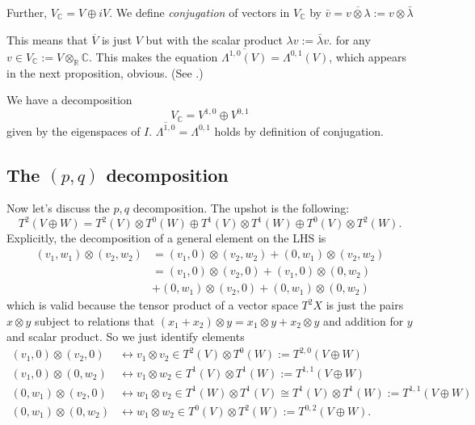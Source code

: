 Further, $V_\mathbb{C}=V \oplus i V$.
We define {\it conjugation} of vectors in
$V_{\mathbb{C}}$ by
$\bar{v}=\overline{v \otimes \lambda} := v
\otimes \bar{\lambda}$

This means that $\overline{V}$ is just $V$
but
with the scalar product $\lambda
v:=\bar{\lambda}v$.
for any $v \in V_{\mathbb{C}}:=V
\otimes_{\mathbb{R}}\mathbb{C}$.
This makes the equation
$\overline{\Lambda^{1,0}(V)}=\Lambda^{0,1}(V)
$,
which appears in the next proposition,
obvious.
(See \cite[p. 25]{huc}.)

\begin{lemma}
\label{lemma-i-eigenspace-decomposition}
We have a decomposition
$$
V_\mathbb{C}=V^{1,0}\oplus V^{0,1}
$$
given by the eigenspaces of $I$.
$\overline{\Lambda^{1,0}}=\Lambda^{0,1}$
holds by definition of conjugation.
\end{lemma}


\subsection{The $(p,q)$ decomposition}
\label{subsection-pq-decomposition}

Now let's discuss the $p,q$ decomposition.
The upshot is the following:
$$
T^2(V \oplus  W)=
T^2(V)\otimes T^0(W)
\oplus T^1(V)\otimes T^1(W)
\oplus T^0(V)\otimes T^2(W).
$$
Explicitly, the decomposition of a general
element on the LHS is
$$
\begin{aligned}
(v_1,w_1)\otimes(v_2,w_2)
&=(v_1,0)\otimes(v_2,w_2)+(0,w_1)\otimes(v_2,
w_2)\\
&=(v_1,0)\otimes(v_2,0)+(v_1,0)\otimes(0,w_2)
\\
&+(0,w_1)\otimes(v_2,0)+(0,w_1)\otimes(0,w_2)
\end{aligned}
$$
which is valid because the tensor product of
a vector space
$T^2X$ is just the pairs $x \otimes y$
subject
to relations that $(x_1+x_2)\otimes y=x_1
\otimes y+x_2\otimes y$
and addition for $y$ and scalar product.
So we just identify elements
$$
\begin{aligned}
(v_1,0)\otimes(v_2,0)
&\leftrightarrow
v_1 \otimes v_2 \in T^2(V) \otimes
T^0(W):=T^{2,0}(V \oplus W)\\
(v_1,0)\otimes(0,w_2)
&\leftrightarrow
v_1 \otimes w_2 \in T^1(V) \otimes T^1(W):=
T^{1,1}(V\oplus W)\\
(0,w_1)\otimes(v_2,0)
&\leftrightarrow
w_1 \otimes v_2 \in T^1(W) \otimes  T^1(V)
\cong T^1(V) \otimes  T^1(W):=T^{1,1}(V\oplus
W)\\
(0,w_1)\otimes(0,w_2)
&\leftrightarrow
w_1\otimes w_2 \in T^0(V) \otimes
T^2(W):=T^{0,2}(V \oplus  W).
\end{aligned}
$$

